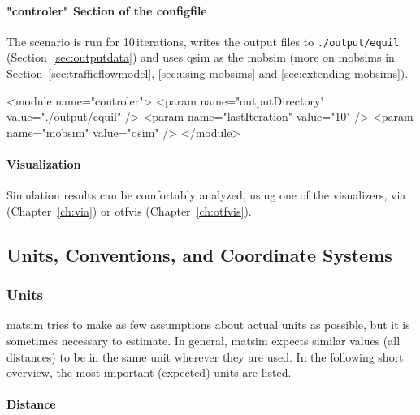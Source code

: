 \paragraph{"controler" Section of the \protect\gls{configfile}}

The scenario is run for 10\,iterations, writes the output files to \lstinline|./output/equil| (Section~\ref{sec:outputdata}) and uses \gls{qsim} as the \gls{mobsim} (more on \glspl{mobsim} in Section~\ref{sec:trafficflowmodel}, \ref{sec:using-mobsims} and \ref{sec:extending-mobsims}).
\begin{xml}
<module name="controler">
	<param name="outputDirectory" value="./output/equil" />
	<param name="lastIteration" value="10" />
	<param name="mobsim" value="qsim" />	
</module>
\end{xml}


\paragraph{Visualization}

Simulation results can be comfortably analyzed, using one of the visualizers, \gls{via} (Chapter~\ref{ch:via}) or \gls{otfvis} (Chapter~\ref{ch:otfvis}).

\subsection{Units, Conventions, and Coordinate Systems}
\label{sec:unitsconventions}
\subsubsection{Units}
\gls{matsim} tries to make as few assumptions about actual units as possible, but it is sometimes necessary to estimate. In general, \gls{matsim} expects similar values (\eg all distances) to be in the same unit wherever they are used. In the following short overview, the most important (expected) units are listed.

\paragraph{Distance}

